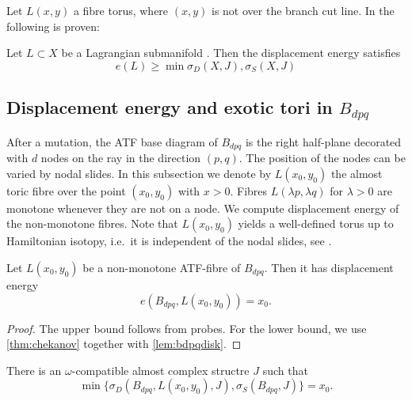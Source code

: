 \documentclass[12pt,a4paper,draft]{scrartcl}
\begin{document}
Let \(L(x,y)\) a fibre torus, where \((x,y)\) is not over the branch cut line. In \cite{chekanov1998} the following is proven:

\begin{theorem}
  \label{thm:chekanov}
  Let \(L ⊂ X\) be a Lagrangian submanifold . Then the displacement energy satisfies
  \[e(L) ≥ \min{σ_D(X,J),σ_S(X,J)}\] 
\end{theorem}

\subsection{Displacement energy and exotic tori in \texorpdfstring{\(B_{dpq}\)}{Bdpq}}

After a mutation, the ATF base diagram of $B_{dpq}$ is the right half-plane decorated with $d$ nodes on the ray in the direction $(p,q)$. The position of the nodes can be varied by nodal slides. In this subsection we denote by $L(x_0,y_0)$ the almost toric fibre over the point $(x_0,y_0)$ with $x > 0$. Fibres $L(\lambda p,\lambda q)$ for $\lambda > 0$ are monotone whenever they are not on a node. We compute displacement energy of the non-monotone fibres. Note that $L(x_0,y_0)$ yields a well-defined torus up to Hamiltonian isotopy, i.e.\ it is independent of the nodal slides, see . 

\begin{proposition}
\label{prop:bdpq}
Let $L(x_0,y_0)$ be a non-monotone ATF-fibre of $B_{dpq}$. Then it has displacement energy
\[e(B_{dpq}, L(x_0,y_0)) = x_0 .\]
\end{proposition}

\begin{proof}
    The upper bound follows from probes. For the lower bound, we use \cref{thm:chekanov} together with \cref{lem:bdpqdisk}. 
\end{proof}

\begin{lemma}
\label{lem:bdpqdisk}
    There is an $\omega$-compatible almost complex structre $J$ such that 
    \[\min \{\sigma_D(B_{dpq}, L(x_0,y_0), J) , \sigma_S(B_{dpq}, J)\} = x_0. \]  
\end{lemma}
\end{document}

